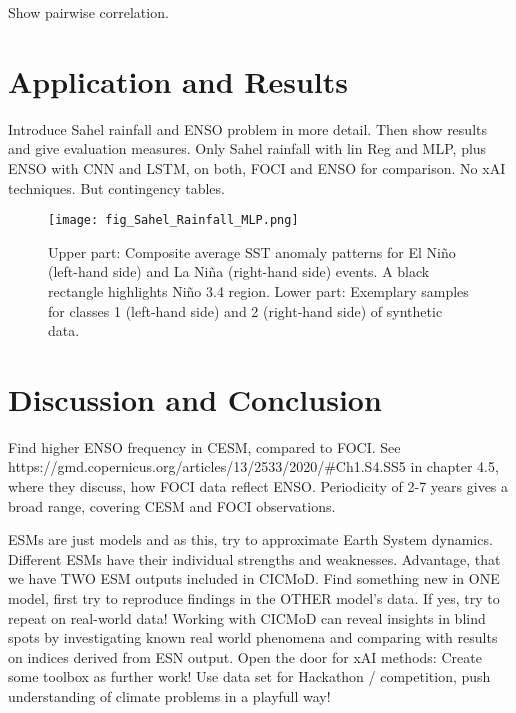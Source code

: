 \documentclass{CUP-JNL-DTM}%
\theoremstyle{definition}
\numberwithin{equation}{section}
\begin{document}
Show pairwise correlation.

\section{Application and Results \label{sec:Application_Results}}

Introduce Sahel rainfall and ENSO problem in more detail. Then show results and give evaluation measures. Only Sahel rainfall with lin Reg and MLP, plus ENSO with CNN and LSTM, on both, FOCI and ENSO for comparison. No xAI techniques. But contingency tables.

\begin{figure}[]
\texttt{[image: fig\_Sahel\_Rainfall\_MLP.png]}
\caption{Upper part: Composite average SST anomaly patterns for El Ni\~{n}o (left-hand side) and La Ni\~{n}a (right-hand side) events. A black rectangle highlights Ni\~{n}o 3.4 region. Lower part: Exemplary samples for classes 1 (left-hand side) and 2 (right-hand side) of synthetic data.}
\label{fig:Data}
\end{figure}


\section{Discussion and Conclusion \label{sec:Discussion_Conclusion}}

Find higher ENSO frequency in CESM, compared to FOCI. See https://gmd.copernicus.org/articles/13/2533/2020/#Ch1.S4.SS5 in chapter 4.5, where they discuss, how FOCI data reflect ENSO. Periodicity of 2-7 years gives a broad range, covering CESM and FOCI observations.

ESMs are just models and as this, try to approximate Earth System dynamics. Different ESMs have their individual strengths and weaknesses. Advantage, that we have TWO ESM outputs included in CICMoD. Find something new in ONE model, first try to reproduce findings in the OTHER model's data. If yes, try to repeat on real-world data! Working with CICMoD can reveal insights in blind spots by investigating known real world phenomena and comparing with results on indices derived from ESN output. 
Open the door for xAI methods: Create some toolbox as further work! Use data set for Hackathon / competition, push understanding of climate problems in a playfull way!
\end{document}
